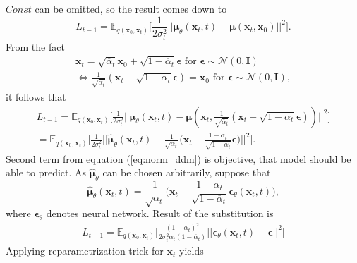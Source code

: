 \documentclass[10pt]{article}
\begin{document}
$Const$ can be omitted, so the result comes down to
\begin{equation}
    L_{t-1} =   \mathbb{E}_{q(\textbf{x}_{0}, \textbf{x}_{t})} \Big[ \frac{1}{2\sigma^2_t}
    ||\bm{\mu}_{\theta}(\textbf{x}_{t}, t) -  \bm{\mu}(\textbf{x}_{t}, \textbf{x}_{0})||^2 \Big].
\end{equation}
From the fact 
\begin{gather}
\textbf{x}_{t} = \sqrt{\overline{\alpha}_t}\textbf{x}_{0} + \sqrt{1 - \overline{\alpha}_t}\bm{\epsilon}
\text{ for } \bm{\epsilon} \sim \mathcal{N}(0, \mathbf{I}) \\
\iff  \frac{1}{\sqrt{\overline{\alpha}_t}}
(\textbf{x}_{t} - \sqrt{1 - \overline{\alpha}_t}\bm{\epsilon} )  = \textbf{x}_{0} 
\text{ for } \bm{\epsilon} \sim \mathcal{N}(0, \mathbf{I}),
\end{gather}
it follows that
\begin{gather}
        L_{t-1} =   \mathbb{E}_{q(\textbf{x}_{0}, \textbf{x}_{t})} \Big[ \frac{1}{2\sigma^2_t}
    ||\bm{\mu}_{\theta}(\textbf{x}_{t}, t) -  \bm{\mu}(\textbf{x}_{t}, 
    \frac{1}{\sqrt{\overline{\alpha}_t}}(\textbf{x}_{t} - \sqrt{1 - \overline{\alpha}_t}\bm{\epsilon} )
    )||^2 \Big] \\
    = \label{eq:norm_ddm}
    \mathbb{E}_{q(\textbf{x}_{0}, \textbf{x}_{t})} \Big[ 
    \frac{1}{2\sigma^2_t}
    ||\hat{\bm{\mu}}_{\theta}(\textbf{x}_{t}, t) -  
    \frac{1}{\sqrt{\alpha_t}}\Big(\textbf{x}_t - \frac{1 - \alpha_t}{\sqrt{1 - \overline{\alpha}_t}}\bm{\epsilon} \Big) ||^2 \Big]. 
\end{gather}
Second term from equation (\ref{eq:norm_ddm}) is objective, that model should be able to predict. As  $\hat{\bm{\mu}}_{\theta}$ can be chosen arbitrarily, suppose that
\begin{equation} \label{eq:elbo_mean}
    \hat{\bm{\mu}}_{\theta}(\textbf{x}_{t}, t) =  \frac{1}{\sqrt{\alpha_t}}\Big(\textbf{x}_t - \frac{1 - \alpha_t}{\sqrt{1 - \overline{\alpha}_t}}\bm{\epsilon}_{\theta}(\textbf{x}_{t}, t) \Big),
\end{equation}
where  $\bm{\epsilon}_{\theta}$ denotes neural network. Result of the substitution is
\begin{gather}
      L_{t-1} =   \mathbb{E}_{q(\textbf{x}_{0}, \textbf{x}_{t})} \Big[
      \frac{(1-\alpha_t)^2}{2\sigma^2_t \alpha_t (1-\overline{\alpha}_t)}
       ||\bm{\epsilon}_{\theta}(\textbf{x}_{t}, t) - \bm{\epsilon} ||^2
      \Big]
\end{gather}
Applying reparametrization trick for $\textbf{x}_t$ yields
\end{document}
